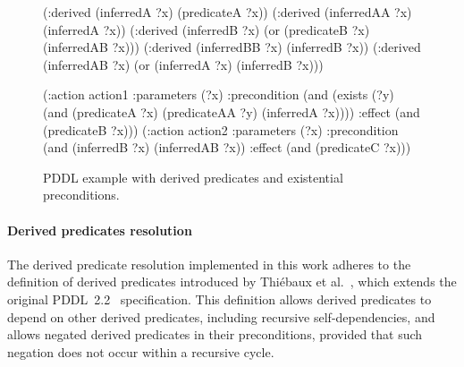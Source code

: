 \begin{figure}[tbp]
\centering
\begin{minipage}[t]{0.49\linewidth}
\begin{Piton}[language=PDDL, line-numbers]
(:derived (inferredA ?x)
  (predicateA ?x))
(:derived (inferredAA ?x)
  (inferredA ?x))
(:derived (inferredB ?x)
  (or (predicateB ?x)
      (inferredAB ?x)))
(:derived (inferredBB ?x)
  (inferredB ?x))
(:derived (inferredAB ?x)
  (or (inferredA ?x)
      (inferredB ?x)))
\end{Piton}
\end{minipage}
\hfill
\begin{minipage}[t]{0.49\linewidth}
\begin{Piton}[language=PDDL, line-numbers={start=13}]
(:action action1
  :parameters (?x)
  :precondition (and (exists (?y)
    (and (predicateA ?x)
         (predicateAA ?y)
         (inferredA ?x))))
  :effect (and (predicateB ?x)))
(:action action2
  :parameters (?x)
  :precondition (and
    (inferredB ?x)
    (inferredAB ?x))
  :effect (and (predicateC ?x)))
\end{Piton}
\end{minipage}
\caption{PDDL example with derived predicates and existential preconditions.}%
\label{planta:lst:example_derived}
\end{figure}


\paragraph{Derived predicates resolution}

The derived predicate resolution implemented in this work adheres to the definition of derived predicates introduced by Thiébaux et al.~\cite{THIEBAUX200538}, which extends the original PDDL~2.2~\cite{edelkamp2004pddl2} specification. This definition allows derived predicates to depend on other derived predicates, including recursive self-dependencies, and allows negated derived predicates in their preconditions, provided that such negation does not occur within a recursive cycle.

